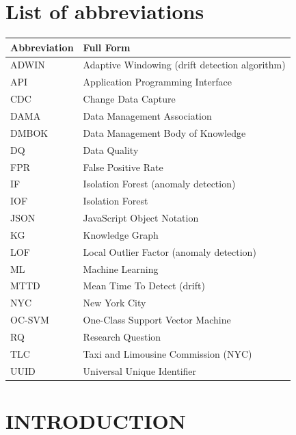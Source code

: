 \documentclass[a4paper, reqno, oneside]{book}
\begin{document}
\newpage
\tableofcontents

\newpage
\listoffigures

\newpage
\listoftables


\chapter*{List of abbreviations}
\vspace{20pt}

\begin{longtable}{|m{2.5cm}|m{10cm}|}
\hline
\textbf{Abbreviation} & \textbf{Full Form} \\ \hline
ADWIN & Adaptive Windowing (drift detection algorithm) \\ \hline
API & Application Programming Interface \\ \hline
CDC & Change Data Capture \\ \hline
DAMA & Data Management Association \\ \hline
DMBOK & Data Management Body of Knowledge \\ \hline
DQ & Data Quality \\ \hline
FPR & False Positive Rate \\ \hline
IF & Isolation Forest (anomaly detection) \\ \hline
IOF & Isolation Forest \\ \hline
JSON & JavaScript Object Notation \\ \hline
KG & Knowledge Graph \\ \hline
LOF & Local Outlier Factor (anomaly detection) \\ \hline
ML & Machine Learning \\ \hline
MTTD & Mean Time To Detect (drift) \\ \hline
NYC & New York City \\ \hline
OC-SVM & One-Class Support Vector Machine \\ \hline
RQ & Research Question \\ \hline
TLC & Taxi and Limousine Commission (NYC) \\ \hline
UUID & Universal Unique Identifier \\ \hline
\end{longtable}


\mainmatter

\chapter{INTRODUCTION}
\pagestyle{fancy}
\end{document}
